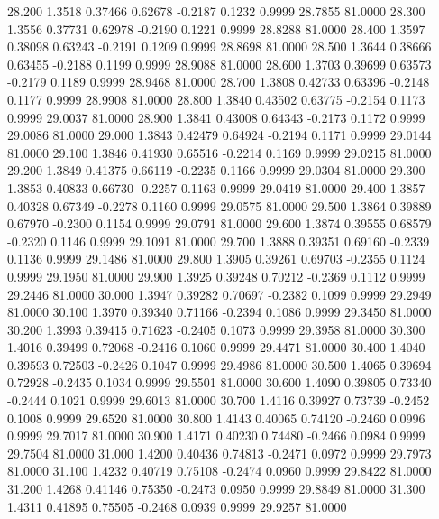   28.200   1.3518   0.37466   0.62678  -0.2187   0.1232   0.9999  28.7855  81.0000
  28.300   1.3556   0.37731   0.62978  -0.2190   0.1221   0.9999  28.8288  81.0000
  28.400   1.3597   0.38098   0.63243  -0.2191   0.1209   0.9999  28.8698  81.0000
  28.500   1.3644   0.38666   0.63455  -0.2188   0.1199   0.9999  28.9088  81.0000
  28.600   1.3703   0.39699   0.63573  -0.2179   0.1189   0.9999  28.9468  81.0000
  28.700   1.3808   0.42733   0.63396  -0.2148   0.1177   0.9999  28.9908  81.0000
  28.800   1.3840   0.43502   0.63775  -0.2154   0.1173   0.9999  29.0037  81.0000
  28.900   1.3841   0.43008   0.64343  -0.2173   0.1172   0.9999  29.0086  81.0000
  29.000   1.3843   0.42479   0.64924  -0.2194   0.1171   0.9999  29.0144  81.0000
  29.100   1.3846   0.41930   0.65516  -0.2214   0.1169   0.9999  29.0215  81.0000
  29.200   1.3849   0.41375   0.66119  -0.2235   0.1166   0.9999  29.0304  81.0000
  29.300   1.3853   0.40833   0.66730  -0.2257   0.1163   0.9999  29.0419  81.0000
  29.400   1.3857   0.40328   0.67349  -0.2278   0.1160   0.9999  29.0575  81.0000
  29.500   1.3864   0.39889   0.67970  -0.2300   0.1154   0.9999  29.0791  81.0000
  29.600   1.3874   0.39555   0.68579  -0.2320   0.1146   0.9999  29.1091  81.0000
  29.700   1.3888   0.39351   0.69160  -0.2339   0.1136   0.9999  29.1486  81.0000
  29.800   1.3905   0.39261   0.69703  -0.2355   0.1124   0.9999  29.1950  81.0000
  29.900   1.3925   0.39248   0.70212  -0.2369   0.1112   0.9999  29.2446  81.0000
  30.000   1.3947   0.39282   0.70697  -0.2382   0.1099   0.9999  29.2949  81.0000
  30.100   1.3970   0.39340   0.71166  -0.2394   0.1086   0.9999  29.3450  81.0000
  30.200   1.3993   0.39415   0.71623  -0.2405   0.1073   0.9999  29.3958  81.0000
  30.300   1.4016   0.39499   0.72068  -0.2416   0.1060   0.9999  29.4471  81.0000
  30.400   1.4040   0.39593   0.72503  -0.2426   0.1047   0.9999  29.4986  81.0000
  30.500   1.4065   0.39694   0.72928  -0.2435   0.1034   0.9999  29.5501  81.0000
  30.600   1.4090   0.39805   0.73340  -0.2444   0.1021   0.9999  29.6013  81.0000
  30.700   1.4116   0.39927   0.73739  -0.2452   0.1008   0.9999  29.6520  81.0000
  30.800   1.4143   0.40065   0.74120  -0.2460   0.0996   0.9999  29.7017  81.0000
  30.900   1.4171   0.40230   0.74480  -0.2466   0.0984   0.9999  29.7504  81.0000
  31.000   1.4200   0.40436   0.74813  -0.2471   0.0972   0.9999  29.7973  81.0000
  31.100   1.4232   0.40719   0.75108  -0.2474   0.0960   0.9999  29.8422  81.0000
  31.200   1.4268   0.41146   0.75350  -0.2473   0.0950   0.9999  29.8849  81.0000
  31.300   1.4311   0.41895   0.75505  -0.2468   0.0939   0.9999  29.9257  81.0000

